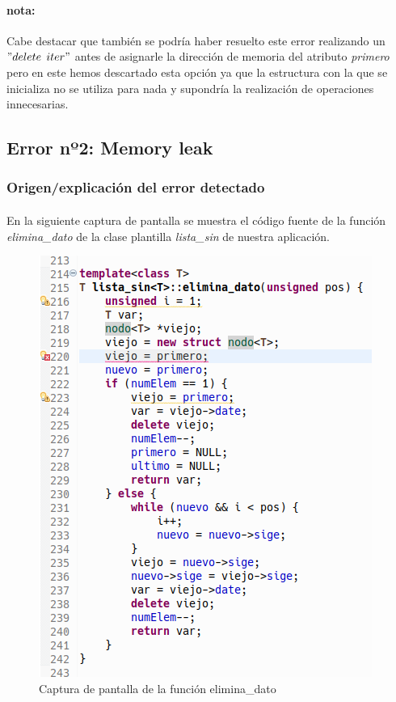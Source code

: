 			\paragraph{nota:}Cabe destacar que también se podría haber resuelto este error realizando un $"delete$ $iter"$ antes de asignarle la dirección de memoria del atributo \textit{primero} pero en este hemos descartado esta opción ya que la estructura con la que se inicializa no se utiliza para nada y supondría la realización de operaciones innecesarias.
			
	\subsection{Error nº2: Memory leak}
	
		\subsubsection{Origen/explicación del error detectado}
		
			\paragraph{}En la siguiente captura de pantalla se muestra el código fuente de la función \textit{elimina\_dato} de la clase plantilla \textit{lista\_sin} de nuestra aplicación.
			
			\begin{figure}[H]
				\centering
				\includegraphics[scale=0.7]{img/captura45.png}
				\caption{Captura de pantalla de la función elimina\_dato}
				\label{captura45}
			\end{figure}
		

